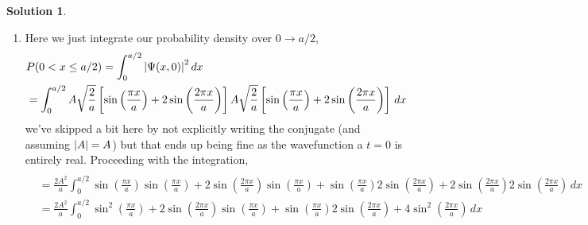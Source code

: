 \documentclass[10pt]{article}
\theoremstyle{definition}
\newtheorem{soln}{Solution}
\begin{document}
\begin{soln}
\begin{enumerate}[label=(\alph*)]
\begin{align*}
              & =\sin\left(\frac{\pi x}{a}\right)\left[1+4\cos\left(\frac{\pi x}{a}\right)\right]                                              \\
              & \implies\sin\left(\frac{\pi x}{a}\right)=0\implies x=2ak, k\in\mathbb{Z} \quad\text{``cheap'' solutions}                       \\
              & \text{AND}                                                                                                                     \\
              & \implies 1+4\cos\left(\frac{\pi x}{a}\right)=0 \implies x=\pm a \mp \frac{a}{\pi}\arccos\left(1/4\right)+2k\pi, k\in\mathbb{Z}
          \end{align*}
          the $\arccos$ equation again gives us our nontrivial solution, $x\approx 0.58$ for $a=1$. See the green markers on the original plot for where all three points lie.
          \newpage
    \item Here we just integrate our probability density over $0\to a/2$,
          \begin{align*}
             & P(0<x\leq a/2)=\int_{0}^{a/2}\abs{\Psi(x,0)}^2\,dx                                                                 \\
             & =\int_{0}^{a/2}A\sqrt{\frac{2}{a}}\left[\sin\left(\frac{\pi x}{a}\right)+2\sin\left(\frac{2\pi x}{a}\right)\right]
            A\sqrt{\frac{2}{a}}\left[\sin\left(\frac{\pi x}{a}\right)+2\sin\left(\frac{2\pi x}{a}\right)\right]\,dx
          \end{align*}
          we've skipped a bit here by not explicitly writing the conjugate (and assuming $\abs{A}=A$) but that ends up being fine as the wavefunction a $t=0$
          is entirely real. Proceeding with the integration,
          \begin{align*}                                                                                                                                                                                                                  \\
             & =\frac{2A^2}{a}\int_{0}^{a/2}\sin\left(\frac{\pi x}{a}\right)\sin\left(\frac{\pi x}{a}\right)+2\sin\left(\frac{2\pi x}{a}\right)\sin\left(\frac{\pi x}{a}\right) + \sin\left(\frac{\pi x}{a}\right)2\sin\left(\frac{2\pi x}{a}\right)+2\sin\left(\frac{2\pi x}{a}\right)2\sin\left(\frac{2\pi x}{a}\right)\,dx \\
             & =\frac{2A^2}{a}\int_{0}^{a/2}\sin^2\left(\frac{\pi x}{a}\right)+2\sin\left(\frac{2\pi x}{a}\right)\sin\left(\frac{\pi x}{a}\right) + \sin\left(\frac{\pi x}{a}\right)2\sin\left(\frac{2\pi x}{a}\right)+4\sin^2\left(\frac{2\pi x}{a}\right)\,dx                                                               \\

\end{align*}
\end{enumerate}
\end{soln}
\end{document}
